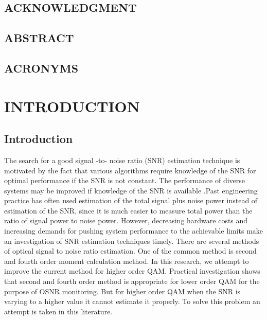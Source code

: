 \documentclass[12pt]{report}
\begin{document}
\begin{center}
	\section*{ACKNOWLEDGMENT}
	\pagebreak
	\section*{ABSTRACT}
	\pagebreak
	\listoffigures
	\pagebreak
	\section*{ACRONYMS}
\end{center}
\begin{acronym}
\end{acronym}
	\tableofcontents
	
	
	
	
	
	\chapter{INTRODUCTION}
	\section{Introduction}
	The search for a good signal -to- noise ratio (SNR) estimation technique is motivated by the fact that various algorithms require knowledge of the SNR for optimal performance if the SNR is not constant. The performance of diverse systems may be improved if knowledge of  the SNR is available .Past engineering practice has often used estimation of the total signal plus noise power instead of estimation of the SNR, since it is much easier to measure total power than the ratio of signal power to noise power. However, decreasing hardware costs and increasing demands for pushing system performance to the achievable limits make an investigation of SNR estimation techniques timely. 
	There are several methods of optical signal to noise ratio estimation. One of the common method is second and fourth order moment calculation method. In this research, we attempt to improve the current method for higher order QAM. Practical investigation shows that second and fourth order method is appropriate for lower order QAM for the purpose of OSNR monitoring. But for higher order QAM when the SNR is varying to a higher value it cannot estimate it properly. To solve this problem an attempt is taken in this literature.
\end{document}
